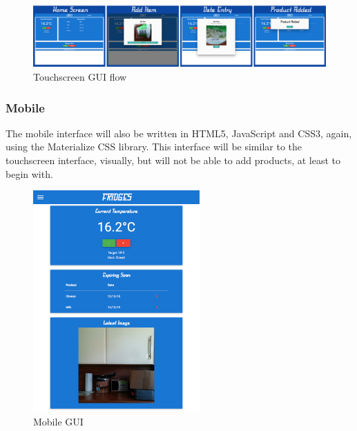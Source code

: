 \documentclass[10pt]{article}
\begin{document}
\begin{figure}[h]
\centering
\caption{Touchscreen GUI flow}
\label{Touchscreen GUI flow}
\includegraphics[width=18cm]{images/GUI-flow.png}
\end{figure}


\subsubsection{Mobile}

The mobile interface will also be written in HTML5, JavaScript and CSS3, again, using the Materialize CSS library. This interface will be similar to the touchscreen interface, visually, but will not be able to add products, at least to begin with.

\begin{figure}[h]
\centering
\caption{Mobile GUI}
\label{Mobile GUI}
\includegraphics[height=8.5cm]{images/Mobile-Screenshot.png}
\end{figure}

\newpage
\end{document}
